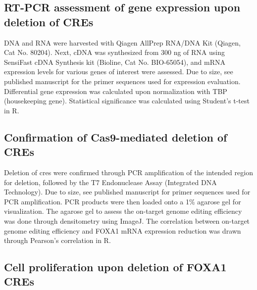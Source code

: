 \subsection{RT-PCR assessment of gene expression upon deletion of CREs}

DNA and RNA were harvested with Qiagen AllPrep RNA/DNA Kit (Qiagen, Cat No. 80204).
Next, cDNA was synthesized from 300 ng of RNA using SensiFast cDNA Synthesis kit (Bioline, Cat No. BIO-65054), and mRNA expression levels for various genes of interest were assessed.
Due to size, see published manuscript for the primer sequences used for expression evaluation.
Differential gene expression was calculated upon normalization with TBP (housekeeping gene).
Statistical significance was calculated using Student's t-test in R.

\subsection{Confirmation of Cas9-mediated deletion of CREs}

Deletion of \glspl{cre} were confirmed through PCR amplification of the intended region for deletion, followed by the T7 Endonuclease Assay (Integrated DNA Technology).
Due to size, see published manuscript for primer sequences used for PCR amplification.
PCR products were then loaded onto a 1\% agarose gel for visualization.
The agarose gel to assess the on-target genome editing efficiency was done through densitometry using ImageJ.
The correlation between on-target genome editing efficiency and FOXA1 mRNA expression reduction was drawn through Pearson's correlation in R.

\subsection{Cell proliferation upon deletion of FOXA1 CREs}


